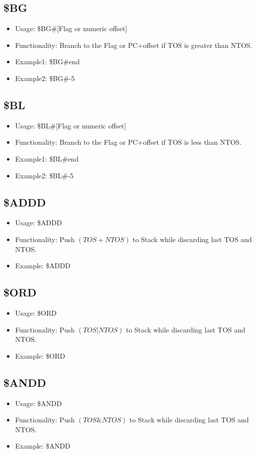 \documentclass[11pt]{report}
\begin{document}
    \subsection{\$BG}
    \begin{itemize}
        \item Usage: \$BG\#[Flag or numeric offset]
        \item Functionality: Branch to the Flag or PC+offset if TOS is greater than NTOS.
        \item Example1: \$BG\#end
        \item Example2: \$BG\#-5
    \end{itemize}
    \subsection{\$BL}
    \begin{itemize}
        \item Usage: \$BL\#[Flag or numeric offset]
        \item Functionality: Branch to the Flag or PC+offset if TOS is less than NTOS.
        \item Example1: \$BL\#end
        \item Example2: \$BL\#-5
    \end{itemize}
    \subsection{\$ADDD}
    \begin{itemize}
        \item Usage: \$ADDD
        \item Functionality: Push $(TOS + NTOS)$ to Stack while discarding last TOS and NTOS.
        \item Example: \$ADDD
    \end{itemize}
    \subsection{\$ORD}
    \begin{itemize}
        \item Usage: \$ORD
        \item Functionality: Push $(TOS | NTOS)$ to Stack while discarding last TOS and NTOS.
        \item Example: \$ORD
    \end{itemize}
    \subsection{\$ANDD}
    \begin{itemize}
        \item Usage: \$ANDD
        \item Functionality: Push $(TOS \& NTOS)$ to Stack while discarding last TOS and NTOS.
        \item Example: \$ANDD
    \end{itemize}
\end{document}
